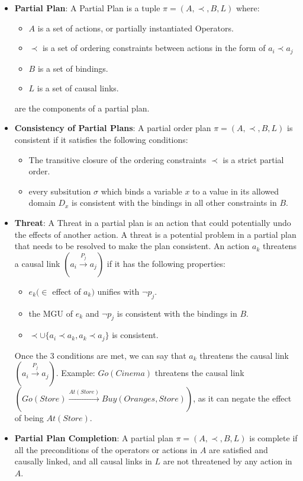 \begin{itemize}
    \item  \label{def:partial_plan}
          \textbf{Partial Plan}: A Partial Plan is a tuple $\pi = (A, \prec, B, L)$ where:
          \begin{itemize}
              \item $A$ is a set of actions, or partially instantiated Operators.
              \item $\prec$ is a set of ordering constraints between actions in the form of $a_i \prec a_j$
              \item $B$ is a set of bindings.
              \item $L$ is a set of causal links.
          \end{itemize}
          are the components of a partial plan.


    \item  \label{def:consistency_partial_plan}
          \textbf{Consistency of Partial Plans}: A partial order plan $\pi = (A, \prec, B, L)$ is consistent if it satisfies the following conditions: \cite{10.5555/975615}
          \begin{itemize}
              \item The transitive closure of the ordering constraints $\prec$ is a strict partial order.
              \item every subsitution $\sigma $ which binds a variable $x$ to a value in its allowed domain $D_x$ is consistent with the bindings in all other constraints in $B$.
          \end{itemize}


    \item  \label{def:threat}
          \textbf{Threat}: A Threat in a partial plan is an action that could potentially undo the effects of another action. A threat is a potential problem in a partial plan that needs to be resolved to make the plan consistent. An action $a_k$ threatens a causal link $(a_i \xrightarrow{\text{$P_j$}}  a_j)$ if it has the following properties:
          \begin{itemize}
              \item $e_k (\in$ effect of $a_k)$ unifies with $\lnot p_j$.
              \item the \ac{MGU} of $e_k$ and $\lnot p_j$ is consistent with the bindings in $B$.
              \item $\prec \cup \{a_i \prec a_k, a_k \prec a_j\}$ is consistent.
          \end{itemize}
          Once the 3 conditions are met, we can say that $a_k$ threatens the causal link $(a_i \xrightarrow{\text{$P_j$}}  a_j)$.
          Example: $Go(Cinema)$ threatens the causal link $(Go(Store) \xrightarrow{\text{$At(Store)$}} Buy(Oranges,Store))$, as it can negate the effect of being $At(Store)$.

    \item  \label{def:partial_plan_completion}
          \textbf{Partial Plan Completion}: A partial plan $\pi = (A, \prec, B, L)$ is complete if all the preconditions of the operators or actions in $A$ are satisfied and causally linked, and all causal links in $L$ are not threatened by any action in $A$.

\end{itemize}
